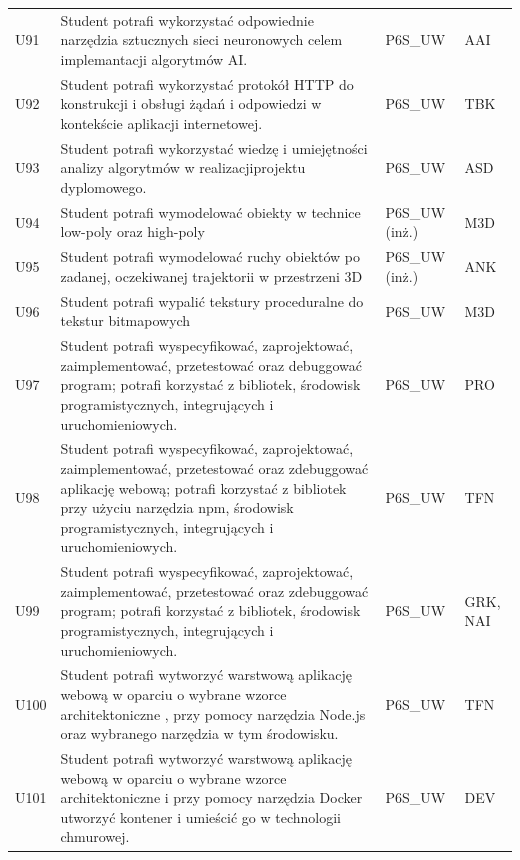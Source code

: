 \documentclass[12pt,a4paper]{article}
\begin{document}
{\begin{longtable}{m{1cm}m{8.8cm}m{2.1cm}m{2.5cm}}
\rowcolor{tableRowLight} U91 & Student potrafi wykorzystać odpowiednie narzędzia sztucznych sieci neuronowych celem implemantacji algorytmów AI. & {\scriptsize P6S\_UW} & {\scriptsize AAI} \\
\rowcolor{tableRowAlt} U92 & Student potrafi wykorzystać protokół HTTP do konstrukcji i obsługi żądań i odpowiedzi w kontekście aplikacji internetowej. & {\scriptsize P6S\_UW} & {\scriptsize TBK} \\
\rowcolor{tableRowLight} U93 & Student potrafi wykorzystać wiedzę i umiejętności analizy algorytmów w realizacjiprojektu dyplomowego. & {\scriptsize P6S\_UW} & {\scriptsize ASD} \\
\rowcolor{tableRowAlt} U94 & Student potrafi wymodelować obiekty w technice low-poly oraz high-poly & {\scriptsize P6S\_UW {\scriptsize (inż.)}} & {\scriptsize M3D} \\
\rowcolor{tableRowLight} U95 & Student potrafi wymodelować ruchy obiektów po zadanej, oczekiwanej trajektorii w przestrzeni 3D & {\scriptsize P6S\_UW {\scriptsize (inż.)}} & {\scriptsize ANK} \\
\rowcolor{tableRowAlt} U96 & Student potrafi wypalić tekstury proceduralne do tekstur bitmapowych & {\scriptsize P6S\_UW} & {\scriptsize M3D} \\
\rowcolor{tableRowLight} U97 & Student potrafi wyspecyfikować, zaprojektować, zaimplementować, przetestować oraz debuggować program; potrafi korzystać z bibliotek, środowisk programistycznych, integrujących i uruchomieniowych. & {\scriptsize P6S\_UW} & {\scriptsize PRO} \\
\rowcolor{tableRowAlt} U98 & Student potrafi wyspecyfikować, zaprojektować, zaimplementować, przetestować oraz zdebuggować aplikację webową; potrafi korzystać z bibliotek przy użyciu narzędzia npm, środowisk programistycznych, integrujących i uruchomieniowych. & {\scriptsize P6S\_UW} & {\scriptsize TFN} \\
\rowcolor{tableRowLight} U99 & Student potrafi wyspecyfikować, zaprojektować, zaimplementować, przetestować oraz zdebuggować program; potrafi korzystać z bibliotek, środowisk programistycznych, integrujących i uruchomieniowych. & {\scriptsize P6S\_UW} & {\scriptsize GRK, NAI} \\
\rowcolor{tableRowAlt} U100 & Student potrafi wytworzyć warstwową aplikację webową w oparciu o wybrane wzorce architektoniczne , przy pomocy narzędzia Node.js oraz wybranego narzędzia w tym środowisku. & {\scriptsize P6S\_UW} & {\scriptsize TFN} \\
\rowcolor{tableRowLight} U101 & Student potrafi wytworzyć warstwową aplikację webową w oparciu o wybrane wzorce architektoniczne i przy pomocy narzędzia Docker utworzyć kontener i umieścić go w technologii chmurowej. & {\scriptsize P6S\_UW} & {\scriptsize DEV} \\

\end{longtable}}
\end{document}
